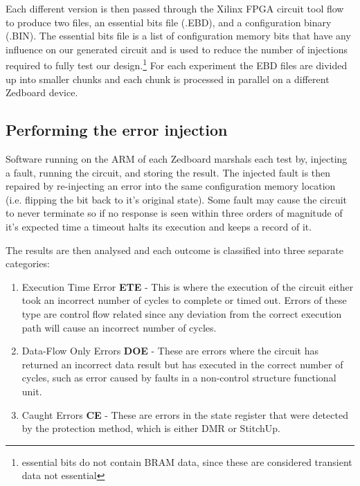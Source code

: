 Each different version is then passed through the Xilinx FPGA circuit tool flow to produce
two files, an essential bits file (.EBD), and a configuration binary (.BIN).
The essential bits file is a list of configuration memory bits that have any
influence on our generated circuit and is used to reduce the number of injections
required to fully test our design.\footnote{essential bits do not contain BRAM data,
since these are considered transient data not essential}
For each experiment the EBD files are divided up into smaller chunks and each chunk is
processed in parallel on a different Zedboard device.

\subsection{Performing the error injection}
Software running on the ARM of each Zedboard marshals each test by, injecting a fault,
running the circuit, and storing the result.
The injected fault is then repaired by re-injecting an error into the
same configuration memory location (i.e. flipping the bit back to it's original state).
Some fault may cause the circuit to never terminate so if no response is seen within three orders
of magnitude of it's expected time a timeout halts its execution and keeps a record of it.

The results are then analysed and each outcome is classified into three separate categories:

\begin{enumerate}
\setlength{\itemsep}{1pt}
\setlength{\parskip}{0pt}
\setlength{\parsep}{0pt}
\item Execution Time Error \textbf{ETE} - This is where the execution of the circuit either took
an incorrect number of cycles to complete or timed out. Errors of these type are
control flow related since any deviation from the correct execution path will cause
an incorrect number of cycles.
\item Data-Flow Only Errors \textbf{DOE} - These are errors where the circuit has returned an incorrect
data result but has executed in the correct number of cycles, such as error caused
by faults in a non-control structure functional unit.
\item Caught Errors \textbf{CE} - These are errors in the state register that were detected by the protection method, which is
either DMR or StitchUp.
\end{enumerate}
